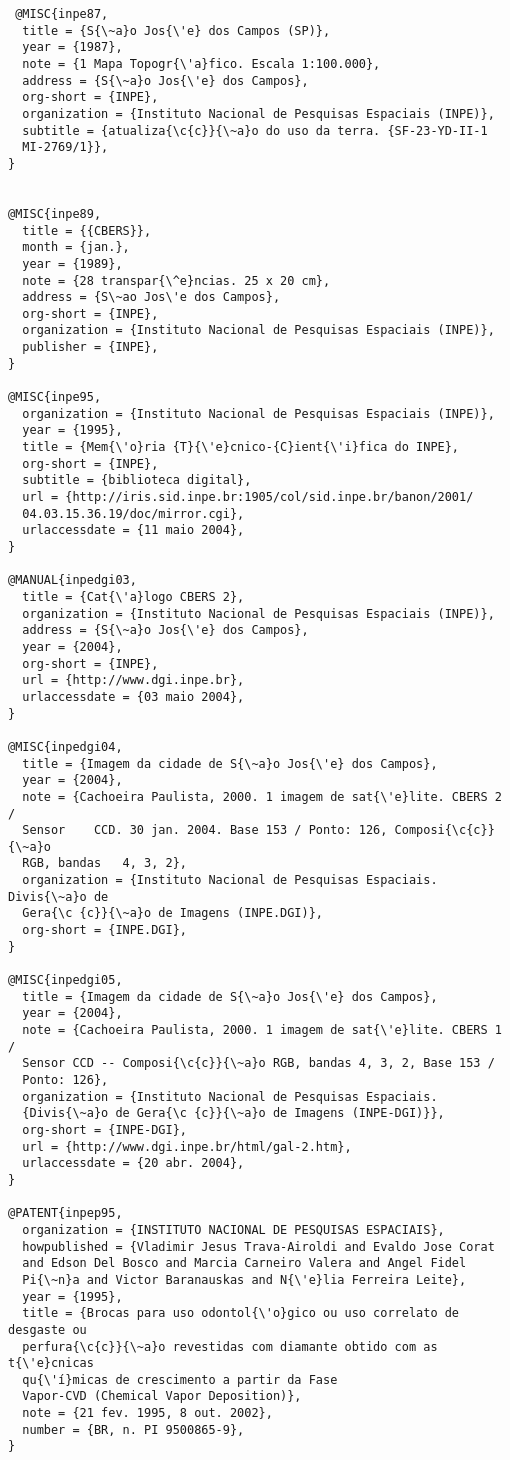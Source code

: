 \begin{verbatim}
 @MISC{inpe87,
  title = {S{\~a}o Jos{\'e} dos Campos (SP)},
  year = {1987},
  note = {1 Mapa Topogr{\'a}fico. Escala 1:100.000},
  address = {S{\~a}o Jos{\'e} dos Campos},
  org-short = {INPE},
  organization = {Instituto Nacional de Pesquisas Espaciais (INPE)},
  subtitle = {atualiza{\c{c}}{\~a}o do uso da terra. {SF-23-YD-II-1 
  MI-2769/1}},
}


@MISC{inpe89,
  title = {{CBERS}},
  month = {jan.},
  year = {1989},
  note = {28 transpar{\^e}ncias. 25 x 20 cm},
  address = {S\~ao Jos\'e dos Campos},
  org-short = {INPE},
  organization = {Instituto Nacional de Pesquisas Espaciais (INPE)},
  publisher = {INPE},
}

@MISC{inpe95, 
  organization = {Instituto Nacional de Pesquisas Espaciais (INPE)},
  year = {1995},
  title = {Mem{\'o}ria {T}{\'e}cnico-{C}ient{\'i}fica do INPE},
  org-short = {INPE},
  subtitle = {biblioteca digital},
  url = {http://iris.sid.inpe.br:1905/col/sid.inpe.br/banon/2001/
  04.03.15.36.19/doc/mirror.cgi},
  urlaccessdate = {11 maio 2004},
} 
 
@MANUAL{inpedgi03,
  title = {Cat{\'a}logo CBERS 2},
  organization = {Instituto Nacional de Pesquisas Espaciais (INPE)},
  address = {S{\~a}o Jos{\'e} dos Campos},
  year = {2004},
  org-short = {INPE},
  url = {http://www.dgi.inpe.br},
  urlaccessdate = {03 maio 2004},
}

@MISC{inpedgi04,
  title = {Imagem da cidade de S{\~a}o Jos{\'e} dos Campos},
  year = {2004},
  note = {Cachoeira Paulista, 2000. 1 imagem de sat{\'e}lite. CBERS 2 / 
  Sensor 	CCD. 30 jan. 2004. Base 153 / Ponto: 126, Composi{\c{c}}{\~a}o 
  RGB, bandas	4, 3, 2},
  organization = {Instituto Nacional de Pesquisas Espaciais. Divis{\~a}o de 
  Gera{\c {c}}{\~a}o de Imagens (INPE.DGI)},
  org-short = {INPE.DGI},
}

@MISC{inpedgi05,
  title = {Imagem da cidade de S{\~a}o Jos{\'e} dos Campos},
  year = {2004},
  note = {Cachoeira Paulista, 2000. 1 imagem de sat{\'e}lite. CBERS 1 / 
  Sensor CCD -- Composi{\c{c}}{\~a}o RGB, bandas 4, 3, 2, Base 153 / 
  Ponto: 126},
  organization = {Instituto Nacional de Pesquisas Espaciais. 
  {Divis{\~a}o de Gera{\c {c}}{\~a}o de Imagens (INPE-DGI)}},
  org-short = {INPE-DGI},
  url = {http://www.dgi.inpe.br/html/gal-2.htm},
  urlaccessdate = {20 abr. 2004},
}

@PATENT{inpep95,
  organization = {INSTITUTO NACIONAL DE PESQUISAS ESPACIAIS}, 
  howpublished = {Vladimir Jesus Trava-Airoldi and Evaldo Jose Corat 
  and Edson Del Bosco and Marcia Carneiro Valera and Angel Fidel 
  Pi{\~n}a and Victor Baranauskas and N{\'e}lia Ferreira Leite},
  year = {1995},
  title = {Brocas para uso odontol{\'o}gico ou uso correlato de desgaste ou 
  perfura{\c{c}}{\~a}o revestidas com diamante obtido com as t{\'e}cnicas 
  qu{\'í}micas de crescimento a partir da Fase 
  Vapor-CVD (Chemical Vapor Deposition)},
  note = {21 fev. 1995, 8 out. 2002},
  number = {BR, n. PI 9500865-9},
}


\end{verbatim}
